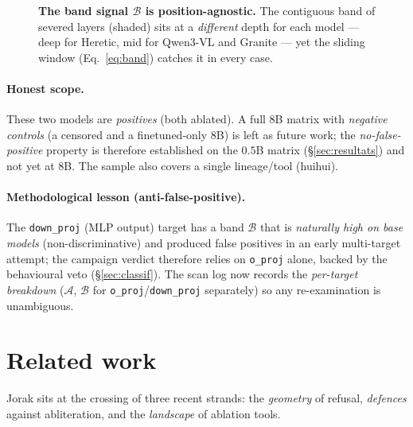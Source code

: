 \documentclass[11pt,a4paper]{article}
\theoremstyle{definition}
\theoremstyle{plain}
\begin{document}
\begin{figure}[H]\centering
{}
\caption{\textbf{The band signal $\mathcal{B}$ is position-agnostic.} The contiguous
band of severed layers (shaded) sits at a \emph{different} depth for each model ---
deep for Heretic, mid for Qwen3-VL and Granite --- yet the sliding window
(Eq.~\eqref{eq:band}) catches it in every case.}
\label{fig:band}
\end{figure}

\paragraph{Honest scope.} These two models are \emph{positives} (both ablated). A full
$8$B matrix with \emph{negative controls} (a censored and a finetuned-only $8$B) is
left as future work; the \emph{no-false-positive} property is therefore established on
the $0.5$B matrix (\S\ref{sec:resultats}) and not yet at $8$B. The sample also covers a
single lineage/tool (huihui).

\paragraph{Methodological lesson (anti-false-positive).} The \texttt{down\_proj} (MLP
output) target has a band $\mathcal{B}$ that is \emph{naturally high on base models}
(non-discriminative) and produced false positives in an early multi-target attempt;
the campaign verdict therefore relies on \texttt{o\_proj} alone, backed by the
behavioural veto (\S\ref{sec:classif}). The scan log now records the \emph{per-target
breakdown} ($\mathcal{A}$, $\mathcal{B}$ for \texttt{o\_proj}/\texttt{down\_proj}
separately) so any re-examination is unambiguous.

\section{Related work}\label{sec:related}
Jorak sits at the crossing of three recent strands: the \emph{geometry} of refusal,
\emph{defences} against abliteration, and the \emph{landscape} of ablation tools.
\end{document}
